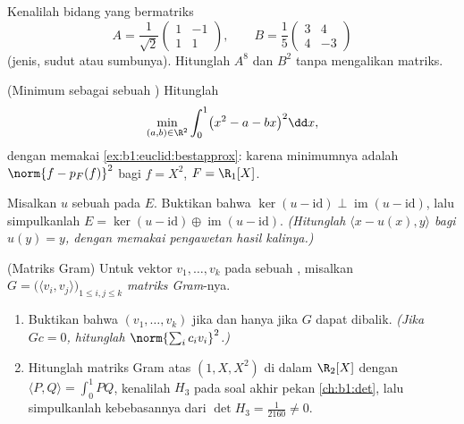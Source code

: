 \begin{exercise}[$\star\star$]\label{exo:b1:euclid:8}
Kenalilah  bidang yang bermatriks
\[
A = \frac{1}{\sqrt 2}\begin{pmatrix} 1 & -1\\ 1 & 1\end{pmatrix},
\qquad
B = \frac{1}{5}\begin{pmatrix} 3 & 4\\ 4 & -3\end{pmatrix}
\]
(jenis, sudut atau sumbunya). Hitunglah $A^8$ dan $B^2$ tanpa
mengalikan matriks.
\end{exercise}

\begin{exercise}[$\star\star\star$]\label{exo:b1:euclid:9}
(Minimum sebagai sebuah ) Hitunglah
\[
\min_{(a, b) \in \R^2} \int_0^1 \bigl(x^2 - a - bx\bigr)^2 \dd x ,
\]
dengan memakai \cref{ex:b1:euclid:bestapprox}: karena minimumnya adalah $\norm{f -
p_F(f)}^2$ bagi $f = X^2$, $F = \R_1[X]$.
\end{exercise}

\begin{exercise}[$\star\star\star$]\label{exo:b1:euclid:10}
Misalkan $u$ sebuah  pada  $E$. Buktikan bahwa
$\ker(u - \mathrm{id}) \perp \operatorname{im}(u - \mathrm{id})$,
lalu simpulkanlah $E = \ker(u - \mathrm{id}) \oplus \operatorname{im}(u -
\mathrm{id})$. \emph{(Hitunglah $\langle x - u(x), y\rangle$ bagi
$u(y) = y$, dengan memakai pengawetan hasil kalinya.)}
\end{exercise}

\begin{exercise}[$\star\star$]\label{exo:b1:euclid:11}
(Matriks Gram) Untuk vektor $v_1, \dots, v_k$ pada sebuah , misalkan $G = \bigl(\langle v_i, v_j\rangle\bigr)_{1 \leq i, j
\leq k}$ \emph{matriks Gram}-nya.
\begin{enumerate}
  \item Buktikan bahwa $(v_1, \dots, v_k)$  jika dan hanya jika
        $G$ dapat dibalik. \emph{(Jika $Gc = 0$, hitunglah
        $\norm{\sum_i c_i v_i}^2$.)}
  \item Hitunglah matriks Gram atas $(1, X, X^2)$ di dalam $\R_2[X]$
        dengan $\langle P, Q\rangle = \int_0^1 PQ$, kenalilah
         $H_3$ pada soal akhir pekan
        \cref{ch:b1:det}, lalu simpulkanlah kebebasannya dari $\det H_3 =
        \frac1{2160} \neq 0$.
\end{enumerate}
\end{exercise}

